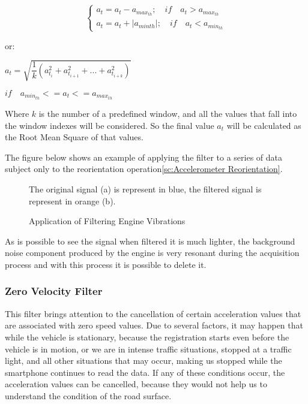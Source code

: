 \documentclass[tesi]{subfiles}
\begin{document}
\begin{center}
\[
    \left\{
                \begin{array}{ll}
                  a_{t} = a_{t} - a_{max_{th}}; \quad 	if \quad a_{t} > a_{max_{th}}\\
              	  a_{t} = a_{t} + |a_{min{th}}|; \quad  if \quad a_{t} < a_{min_{th}}
                \end{array}
              \right.
\]
\end{center}
or:
\begin{center}
$a_{t} = \sqrt{\dfrac{1}{k} (a_{t_{i}}^{2} + a_{t_{i+1}}^{2} + ... + a_{t_{i+k}}^{2} )} $\\
\end{center}
\begin{center}
$if\quad  a_{min_{th}} <= a_{t} <= a_{max_{th}} $


Where $k$ is the number of a predefined window, and all the values that fall into the window indexes will be considered.
So the final value $a_{t}$ will be calculated as the Root Mean Square of that values.
\end{center}

The figure below shows an example of applying the filter to a series of data subject only to the reorientation operation\ref{sc:Accelerometer Reorientation}.

\begin{figure}[H]	


\centering
{}

The original signal (a) is represent in blue, the filtered signal is represent in orange (b).
 \caption{Application of Filtering Engine Vibrations}
  \label{fig:Application of Engine Vibrations Filter.}
\end{figure}
As is possible to see the signal when filtered it is much lighter, the background noise component produced by the engine is very resonant during the acquisition process and with this process it is possible to delete it.

\subsubsection{Zero Velocity Filter}\label{sssc:Zero Velocity Filter}
This filter brings attention to the cancellation of certain acceleration values that are associated with zero speed values. Due to several factors, it may happen that while the vehicle is stationary,  because the registration starts even before the vehicle is in motion, or we are in intense traffic situations, stopped at a traffic light, and all other situations that may occur, making us stopped while the smartphone continues to read the data. If any of these conditions occur, the acceleration values can be cancelled, because they would not help us to understand the condition of the road surface.
\end{document}
